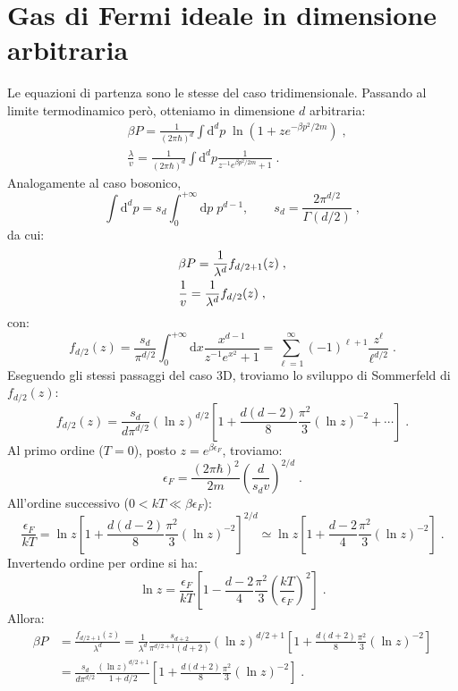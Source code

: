 \documentclass[10pt,a4paper]{report}
\theoremstyle{definition}
\numberwithin{equation}{section}
\newcommand{\diff}[1][]{\mathrm{d}#1}
\begin{document}
\section{Gas di Fermi ideale in dimensione arbitraria}
Le equazioni di partenza sono le stesse del caso tridimensionale. Passando al limite termodinamico però, otteniamo in dimensione $d$ arbitraria:
\begin{align}
&\beta P=\frac{1}{(2\pi\hbar)^d}\int\diff^d{p}\;\ln\left(1+ze^{-\beta p^2/2m}\right)\;, \\
&\frac{\lambda}{v}=\frac{1}{(2\pi\hbar)^d}\int\diff^d{p}\frac{1}{z^{-1}e^{\beta p^2/2m}+1}\;.
\end{align}
Analogamente al caso bosonico,
$$
\int\diff^d{p}=s_d\int_0^{+\infty}\diff{p}\; p^{d-1}, \qquad s_d=\frac{2\pi^{d/2}}{\Gamma(d/2)}\;,
$$
da cui:
\begin{align}
&\beta P=\frac{1}{\lambda^d}f_{d/2+1}(z) \notag\;, \\
&\frac{1}{v}=\frac{1}{\lambda^d}f_{d/2}(z)\;,
\end{align}
con:
\begin{equation}
f_{d/2}(z)=\frac{s_d}{\pi^{d/2}}\int_0^{+\infty}\diff{x}\frac{x^{d-1}}{z^{-1}e^{x^2}+1}=\sum_{\ell=1}^{\infty}(-1)^{\ell+1}\frac{z^{\ell}}{\ell^{d/2}}\;.
\end{equation}
Eseguendo gli stessi passaggi del caso 3D, troviamo lo sviluppo di Sommerfeld di $f_{d/2}(z)$:
\begin{equation}
f_{d/2}(z)=\frac{s_d}{d\pi^{d/2}}(\ln z)^{d/2}\left[1+\frac{d(d-2)}{8}\frac{\pi^2}{3}(\ln z)^{-2}+\cdots\right]\;.
\end{equation}
Al primo ordine ($T=0$), posto $z=e^{\beta\epsilon_F}$, troviamo:
\begin{equation}
\epsilon_F=\frac{(2\pi\hbar)^2}{2m}\left(\frac{d}{s_d v}\right)^{2/d}\;.
\end{equation}
All'ordine successivo ($0<kT\ll \beta\epsilon_F$):
\begin{equation}
\frac{\epsilon_F}{kT}=\ln z\left[1+\frac{d(d-2)}{8}\frac{\pi^2}{3}(\ln z)^{-2}\right]^{2/d}\simeq \ln z\left[1+\frac{d-2}{4}\frac{\pi^2}{3}(\ln z)^{-2}\right]\;.
\end{equation}
Invertendo ordine per ordine si ha:
\begin{equation}
\ln z=\frac{\epsilon_F}{kT}\left[1-\frac{d-2}{4}\frac{\pi^2}{3}\left(\frac{kT}{\epsilon_F}\right)^2\right]\;.
\end{equation}
Allora:
\begin{align*}
\beta P &= \frac{f_{d/2+1}(z)}{\lambda^d}=\frac{1}{\lambda^d}\frac{s_{d+2}}{\pi^{d/2+1}(d+2)}(\ln z)^{d/2+1}\left[1+\frac{d(d+2)}{8}\frac{\pi^2}{3}(\ln z)^{-2}\right] \\
&=\frac{s_d}{d\pi^{d/2}}\frac{(\ln z)^{d/2+1}}{1+d/2}\left[1+\frac{d(d+2)}{8}\frac{\pi^2}{3}(\ln z)^{-2}\right]\;.
\end{align*}
\end{document}

